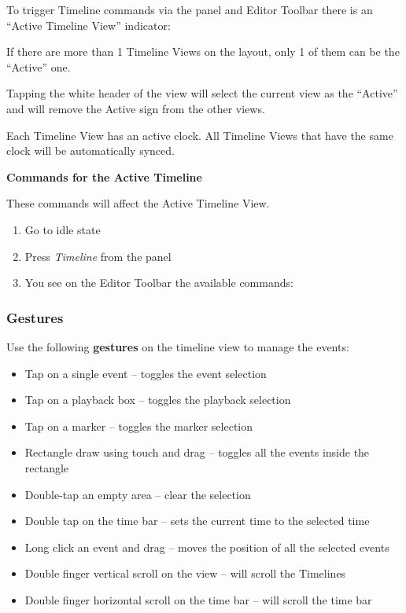 \documentclass[
]{article}
\begin{document}
To trigger Timeline commands via the panel and Editor Toolbar there is an ``Active Timeline View'' indicator:

If there are more than 1 Timeline Views on the layout, only 1 of them can be the ``Active'' one.

Tapping the white header of the view will select the current view as the ``Active'' and will remove the Active sign from the other views.

{Each Timeline View has an active clock. All Timeline Views that have the same clock will be automatically synced.}

\textbf{Commands for the Active Timeline}

These commands will affect the Active Timeline View.

\begin{enumerate}
\def\labelenumi{\arabic{enumi}.}
\item
  Go to idle state
\item
  Press \emph{Timeline} from the panel
\item
  You see on the Editor Toolbar the available commands:
\end{enumerate}

\hypertarget{gestures}{%
\subsubsection{Gestures}\label{gestures}}

Use the following \textbf{gestures} on the timeline view to manage the events:

\begin{itemize}
\item
  Tap on a single event -- toggles the event selection
\item
  Tap on a playback box -- toggles the playback selection
\item
  Tap on a marker -- toggles the marker selection
\item
  Rectangle draw using touch and drag -- toggles all the events inside the rectangle
\item
  Double-tap an empty area -- clear the selection
\item
  Double tap on the time bar -- sets the current time to the selected time
\item
  Long click an event and drag -- moves the position of all the selected events
\item
  Double finger vertical scroll on the view -- will scroll the Timelines
\item
  Double finger horizontal scroll on the time bar -- will scroll the time bar
\end{itemize}
\end{document}
